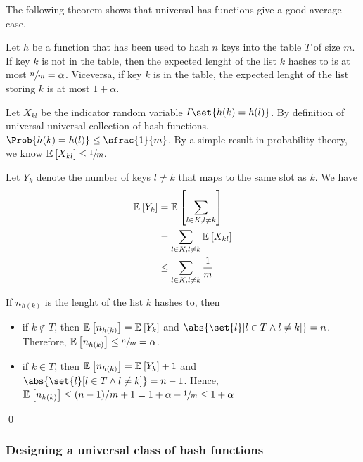 \documentclass{subfiles}
\begin{document}
    The following theorem shows that universal has functions give a good-average case.
    \begin{theorem}
        Let \(h\) be a function that has been used to hash \(n\) keys into the table \(T\) of size \(m\).
            If key \(k\) is not in the table, then the expected lenght of the list \(k\) hashes to is at most
            \(\sfrac{n}{m} = \alpha\). Viceversa, if key \(k\) is in the table, 
            the expected lenght of the list storing \(k\) is at most \(1 + \alpha\).
    \end{theorem}
    \begin{proof*}
        Let \(X_{kl}\) be the indicator random variable \(I\set{h(k) = h(l)}\).
            By definition of universal universal collection of hash functions,
            \(\Prob{h(k) = h(l)} \le \sfrac{1}{m}\). By a simple result in probability theory,
            we know \(\E[X_{kl}]{} \le \sfrac{1}{m}\).

        Let \(Y_{k}\) denote the number of keys \(l \ne k\) that maps to the same slot as \(k\).
        We have
        \[\begin{aligned}
            \E[Y_{k}]{} & = \E[\sum_{l \in K, l \ne k}]{} \\ 
                     & = \sum_{l \in K, l \ne k} \E[X_{kl}]{} \\ 
                     & \le \sum_{l \in K, l \ne k} \frac{1}{m}                  
        \end{aligned}\]
        
        If \(n_{h(k)}\) is the lenght of the list \(k\) hashes to, then 
        \begin{itemize}
            \item if \(k \notin T\), then \(\E[n_{h(k)}]{} = \E[Y_{k}]{}\) and 
                \(\abs{\set{l}[l \in T \land l \ne k]} = n\).
                Therefore, \(\E[n_{h(k)}]{} \le \sfrac{n}{m} = \alpha\).

            \item if \(k \in T\), then \(\E[n_{h(k)}]{} = \E[Y_{k}]{} + 1\) and
                \(\abs{\set{l}[l \in T \land l \ne k]} = n - 1\).
                Hence, \(\E[n_{h(k)}]{} \le (n - 1) / m  + 1 = 1 + \alpha - \sfrac{1}{m}  \le 1 + \alpha\)
        \end{itemize}\qed
    \end{proof*}

    \subsubsection{Designing a universal class of hash functions}
    
\end{document}
